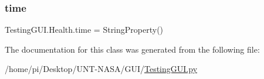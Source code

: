 \mbox{\label{classTestingGUI_1_1Health_a54e3f1adc11ad4d864b67012799706ac}} 
\subsubsection{\texorpdfstring{time}{time}}
{\footnotesize\ttfamily Testing\+G\+U\+I.\+Health.\+time = String\+Property()\hspace{0.3cm}{\ttfamily [static]}}



The documentation for this class was generated from the following file\+:\begin{DoxyCompactItemize}
\item 
/home/pi/\+Desktop/\+U\+N\+T-\/\+N\+A\+S\+A/\+G\+U\+I/\hyperlink{GUI_2TestingGUI_8py}{Testing\+G\+U\+I.\+py}\end{DoxyCompactItemize}
